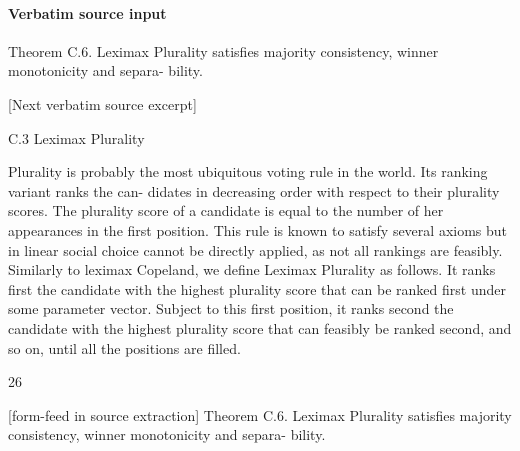 \documentclass[10pt]{article}
\begin{document}
\paragraph{Verbatim source input}
\begin{ReviewVerbatim}
Theorem C.6. Leximax Plurality satisfies majority consistency, winner monotonicity and separa-
bility.

[Next verbatim source excerpt]

C.3   Leximax Plurality

Plurality is probably the most ubiquitous voting rule in the world. Its ranking variant ranks the can-
didates in decreasing order with respect to their plurality scores. The plurality score of a candidate
is equal to the number of her appearances in the first position. This rule is known to satisfy several
axioms but in linear social choice cannot be directly applied, as not all rankings are feasibly.
Similarly to leximax Copeland, we define Leximax Plurality as follows. It ranks first the candidate
with the highest plurality score that can be ranked first under some parameter vector. Subject to
this first position, it ranks second the candidate with the highest plurality score that can feasibly be
ranked second, and so on, until all the positions are filled.


                                                  26

[form-feed in source extraction]
Theorem C.6. Leximax Plurality satisfies majority consistency, winner monotonicity and separa-
bility.


\end{ReviewVerbatim}
\end{document}
